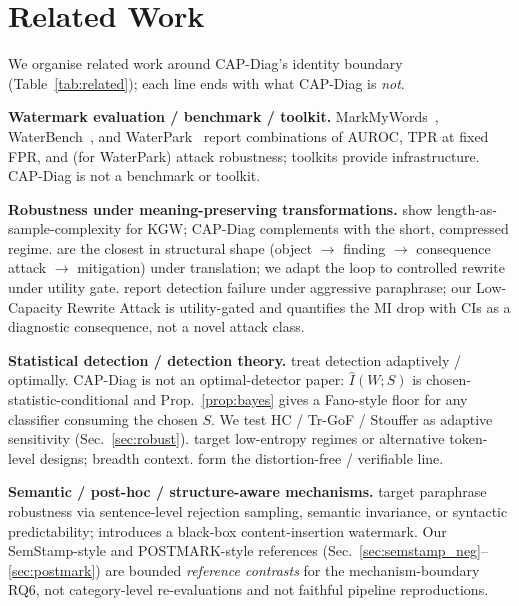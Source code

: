 \documentclass[11pt]{article}
\begin{document}
\section{Related Work}
\label{sec:related}



We organise related work around CAP-Diag's identity boundary
(Table~\ref{tab:related}); each line ends with what CAP-Diag is \emph{not}.

\textbf{Watermark evaluation / benchmark / toolkit.}
MarkMyWords~\citep{piet2024markmywords},
WaterBench~\citep{tu2024waterbench}, and
WaterPark~\citep{liang2024waterpark} report combinations of AUROC, TPR at
fixed FPR, and (for WaterPark) attack robustness; toolkits provide
infrastructure. CAP-Diag is not a benchmark or toolkit.

\textbf{Robustness under meaning-preserving transformations.}
\citet{kirchenbauer2024reliability} show length-as-sample-complexity for
KGW; CAP-Diag complements with the short, compressed regime.
\citet{he2024crosslingual} are the closest in structural shape (object
$\rightarrow$ finding $\rightarrow$ consequence attack $\rightarrow$
mitigation) under translation; we adapt the loop to controlled rewrite
under utility gate. \citet{krishna2023paraphrasing,sadasivan2025undetectable}
report detection failure under aggressive paraphrase; our Low-Capacity
Rewrite Attack is utility-gated and quantifies the MI drop with CIs as a
diagnostic consequence, not a novel attack class.

\textbf{Statistical detection / detection theory.}
\citet{li2024trgof,tsur2025couplings} treat detection adaptively /
optimally. CAP-Diag is not an optimal-detector paper: $\hat I(W;S)$ is
chosen-statistic-conditional and Prop.~\ref{prop:bayes} gives a
Fano-style floor for any classifier consuming the chosen $S$. We test HC
/ Tr-GoF / Stouffer as adaptive sensitivity (Sec.~\ref{sec:robust}).
\citet{tsur2025heavywater,liyihan2023word,li2025bimarker} target
low-entropy regimes or alternative token-level designs; breadth context.
\citet{kuditipudi2024robust,aaronson2023watermark,christ2024undetectable,duan2025pvmark}
form the distortion-free / verifiable line.

\textbf{Semantic / post-hoc / structure-aware mechanisms.}
\citet{hou2024semstamp,liu2024semantic,dabiriaghdam2025simmark,han2025synguard,park2025stela}
target paraphrase robustness via sentence-level rejection sampling,
semantic invariance, or syntactic predictability;
\citet{yoo2024postmark} introduces a black-box content-insertion
watermark. Our SemStamp-style and POSTMARK-style references
(Sec.~\ref{sec:semstamp_neg}--\ref{sec:postmark}) are bounded
\emph{reference contrasts} for the mechanism-boundary RQ6, not
category-level re-evaluations and not faithful pipeline reproductions.
\end{document}
